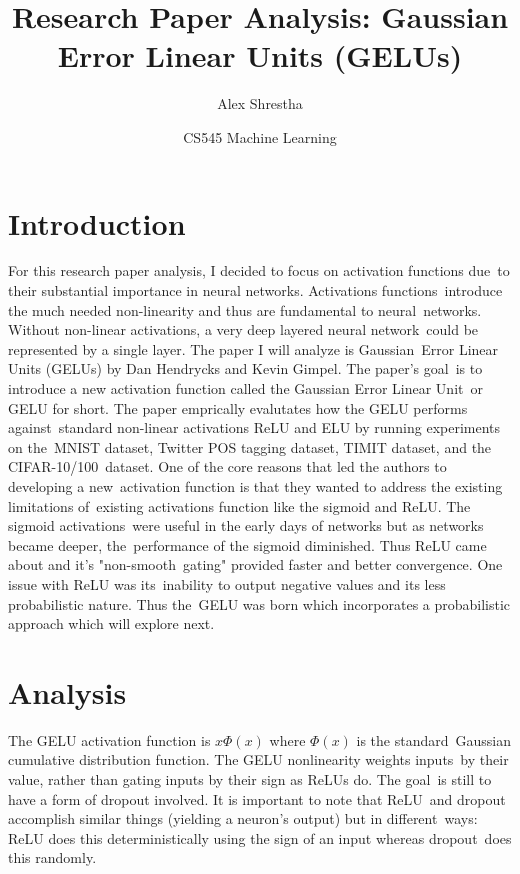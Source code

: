 \documentclass[12pt]{article}
\title{Research Paper Analysis: Gaussian Error Linear Units (GELUs)}
\author{Alex Shrestha}
\date{CS545 Machine Learning }
\begin{document}
\maketitle

\section{Introduction}
For this research paper analysis, I decided to focus on activation functions due\
to their substantial importance in neural networks. Activations functions\ 
introduce the much needed non-linearity and thus are fundamental to neural\
networks. Without non-linear activations, a very deep layered neural network\
could be represented by a single layer. The paper I will analyze is Gaussian\
Error Linear Units (GELUs) by Dan Hendrycks and Kevin Gimpel. The paper's goal\
is to introduce a new activation function called the Gaussian Error Linear Unit\
or GELU for short. The paper emprically evalutates how the GELU performs against\
standard non-linear activations ReLU and ELU by running experiments on the\
MNIST dataset, Twitter POS tagging dataset, TIMIT dataset, and the CIFAR-10/100\
dataset. One of the core reasons that led the authors to developing a new\
activation function is that they wanted to address the existing limitations of\
existing activations function like the sigmoid and ReLU. The sigmoid activations\
were useful in the early days of networks but as networks became deeper, the\
performance of the sigmoid diminished. Thus ReLU came about and it's "non-smooth\
gating" provided faster and better convergence. One issue with ReLU was its\
inability to output negative values and its less probabilistic nature. Thus the\
GELU was born which incorporates a probabilistic approach which will explore next.

\section{Analysis}
The GELU activation function is \( x \Phi(x) \) where $\Phi(x)$ is the standard\
Gaussian cumulative distribution function. The GELU nonlinearity weights inputs\
by their value, rather than gating inputs by their sign as ReLUs do. The goal\
is still to have a form of dropout involved. It is important to note that ReLU\
and dropout accomplish similar things (yielding a neuron's output) but in different\
ways: ReLU does this deterministically using the sign of an input whereas dropout\
does this randomly.

\text{\newline}
\end{document}
